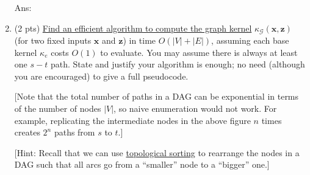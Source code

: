 \documentclass[10pt,letter,notitlepage]{article}
\newcommand{\xv}{\mathbf{x}}
\newcommand{\zv}{\mathbf{z}}
\newcommand{\ans}[1]{{\color{blue}\textsf{Ans}: #1}}
\begin{document}
\begin{exercise}
\begin{enumerate}
			\begin{center}
			\end{center}

			\ans{\vskip3cm}
			
			\item (2 pts) \uline{Find an efficient algorithm to compute the graph kernel} $\kappa_{\mathcal{G}}(\xv, \zv)$ (for two fixed inputs $\xv$ and $\zv$) in time $O(|V| + |E|)$, assuming each base kernel $\kappa_e$ costs $O(1)$ to evaluate. You may assume there is always at least one $s-t$ path. State and justify your algorithm is enough; no need (although you are encouraged) to give a full pseudocode. 
			
			[Note that the total number of paths in a DAG can be exponential in terms of the number of nodes $|V|$, so naive enumeration would not work. For example, replicating the intermediate nodes in the above figure $n$ times creates $2^n$ paths from $s$ to $t$.]
			
			[Hint: Recall that we can use \href{https://en.wikipedia.org/wiki/Topological_sorting}{topological sorting} to rearrange the nodes in a DAG such that all arcs go from a ``smaller'' node to a ``bigger'' one.]
			

\end{enumerate}
\end{exercise}
\end{document}
